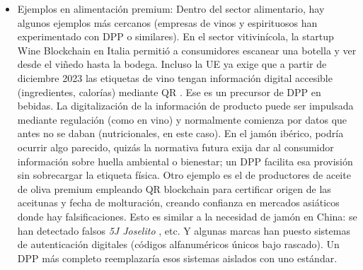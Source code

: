 \begin{itemize}
    \item Ejemplos en alimentación premium: Dentro del sector alimentario, hay algunos ejemplos más cercanos (empresas de vinos y espirituosos han experimentado con DPP o similares). En el sector vitivinícola, la startup Wine Blockchain en Italia permitió a consumidores escanear una botella y ver desde el viñedo hasta la bodega. Incluso la UE ya exige que a partir de diciembre 2023 las etiquetas de vino tengan información digital accesible (ingredientes, calorías) mediante QR \cite{motusic_understanding_2024}. Ese es un precursor de DPP en bebidas. La digitalización de la información de producto puede ser impulsada mediante regulación (como en vino) y normalmente comienza por datos que antes no se daban (nutricionales, en este caso). En el jamón ibérico, podría ocurrir algo parecido, quizás la normativa futura exija dar al consumidor información sobre huella ambiental o bienestar; un DPP facilita esa provisión sin sobrecargar la etiqueta física. Otro ejemplo es el de productores de aceite de oliva premium empleando QR blockchain para certificar origen de las aceitunas y fecha de molturación, creando confianza en mercados asiáticos donde hay falsificaciones. Esto es similar a la necesidad de jamón en China: se han detectado falsos \textit{5J Joselito} \cite{guardia_civil_incautadas_2023}, etc. Y algunas marcas han puesto sistemas de autenticación digitales (códigos alfanuméricos únicos bajo rascado). Un DPP más completo reemplazaría esos sistemas aislados con uno estándar.
\end{itemize}


